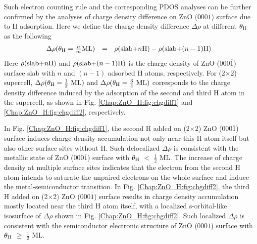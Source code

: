 Such electron counting rule and the corresponding \ac{PDOS} analyses can be further confirmed by the analyses of charge density difference on ZnO (000$\overline{1}$) surface due to H adsorption. Here we define the charge density difference $\Delta\rho$ at different $\theta_{\textup{H}}$ as the following
\begin{equation}
  \begin{array}{rcl}
    \Delta\rho(\theta_{\textup{H}}=\frac{n}{m}\textup{ML})&=&\rho(\textup{slab+}n\textup{H})-\rho(\textup{slab+}(n-1)\textup{H})
  \end{array}
  \label{eq2}
\end{equation}
Here $\rho(\textup{slab+}n \textup{H})$ and $\rho(\textup{slab+}(n-1) \textup{H})$ is the charge density of ZnO (000$\overline{1}$) surface slab with $n$ and $(n-1)$ adsorbed H atoms, respectively. For (2$\times$2) supercell, $\Delta\rho(\theta_{\textup{H}}= \frac{1}{2} \textup{ ML})$ and  $\Delta\rho(\theta_{\textup{H}}= \frac{3}{4} \textup{ ML})$ corresponds to the charge density difference induced by the adsorption of the second and third H atom in the supercell, as shown in Fig. \ref{Chap:ZnO_H:fig:chgdiff1} and  \ref{Chap:ZnO_H:fig:chgdiff2}, respectively. 

In Fig. \ref{Chap:ZnO_H:fig:chgdiff1}, the second H added on (2$\times$2) ZnO (000$\overline{1}$) surface induces charge density accumulation not only near this H atom itself but also other surface sites without H. Such delocalized $\Delta\rho$ is consistent with the metallic state of ZnO (000$\overline{1}$) surface with $\theta_{\textup{H}}$ $<$ $\frac{1}{2}$ \ac{ML}. The increase of charge density at multiple surface sites indicates that the electron from the second H atom intends to saturate the unpaired electrons on the whole surface and induce the metal-semiconductor transition. In Fig. \ref{Chap:ZnO_H:fig:chgdiff2}, the third H added on (2$\times$2) ZnO (000$\overline{1}$) surface results in charge density accumulation mostly located near the third H atom itself, with a localized s-orbital-like isosurface of $\Delta\rho$ shown in Fig. \ref{Chap:ZnO_H:fig:chgdiff2}. Such localized $\Delta\rho$ is consistent with the semiconductor electronic structure of ZnO (000$\overline{1}$) surface with $\theta_{\textup{H}}$ $\geq$ $\frac{1}{2}$ \ac{ML}.
